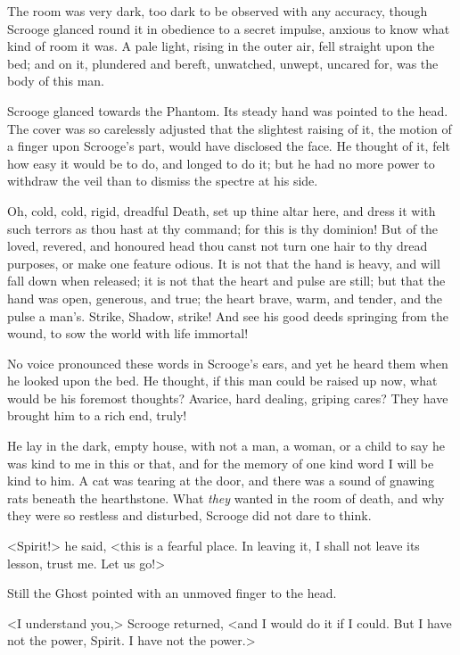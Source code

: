 The room was very dark, too dark to be observed with any accuracy, though Scrooge glanced round it in obedience to a secret impulse, anxious to know what kind of room it was. A pale light, rising in the outer air, fell straight upon the bed; and on it, plunder\-ed and bereft, unwatched, unwept, uncared for, was the body of this man.

Scrooge glanced towards the Phantom. Its steady hand was pointed to the head. The cover was so carelessly adjusted that the slightest raising of it, the motion of a finger upon Scrooge's part, would have disclosed the face. He thought of it, felt how easy it would be to do, and longed to do it; but he had no more power to withdraw the veil than to dismiss the spectre at his side.

Oh, cold, cold, rigid, dreadful Death, set up thine altar here, and dress it with such terrors as thou hast at thy command; for this is thy dominion! But of the loved, revered, and honoured head thou canst not turn one hair to thy dread purposes, or make one feature odious. It is not that the hand is heavy, and will fall down when released; it is not that the heart and pulse are still; but that the hand was open, generous, and true; the heart brave, warm, and tender, and the pulse a man's. Strike, Shadow, strike! And see his good deeds springing from the wound, to sow the world with life immortal!

No voice pronounced these words in Scrooge's ears, and yet he heard them when he looked upon the bed. He thought, if this man could be raised up now, what would be his foremost thoughts? Avarice, hard dealing, griping cares? They have brought him to a rich end, truly!

He lay in the dark, empty house, with not a man, a woman, or a child to say he was kind to me in this or that, and for the memory of one kind word I will be kind to him. A cat was tearing at the door, and there was a sound of gnawing rats beneath the hearthstone. What \textit{they} wanted in the room of death, and why they were so restless and disturbed, Scrooge did not dare to think.

<Spirit!> he said, <this is a fearful place. In leaving it, I shall not leave its lesson, trust me. Let us go!>

Still the Ghost pointed with an unmoved finger to the head.

<I understand you,> Scrooge returned, <and I would do it if I could. But I have not the power, Spirit. I have not the power.>

